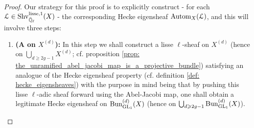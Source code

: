             \begin{proof}
                Our strategy for this proof is to explicitly construct - for each $\mathcal{L} \in \mathrm{Shv}_{\bar{\mathbb{Q}}_{\ell}}^{\mathrm{lisse}, 1}(X)$ - the corresponding Hecke eigensheaf $\mathrm{Autom}_X(\mathcal{L})$, and this will involve three steps:
                    \begin{enumerate}
                        \item \textbf{(A  on $X^{(d)}$):} In this step we shall construct a lisse $\ell$-sheaf on $X^{(d)}$ (hence on $\bigcup_{d \geq 2g - 1} X^{(d)}$; cf. proposition \ref{prop: the_unramified_abel_jacobi_map_is_a_projective_bundle}) satisfying an analogue of the Hecke eigensheaf property (cf. definition \ref{def: hecke_eigensheaves}) with the purpose in mind being that by pushing this lisse $\ell$-adic sheaf forward using the Abel-Jacobi map, one shall obtain a legitimate Hecke eigensheaf on $\mathrm{Bun}_{\operatorname{GL}_1}^{(d)}(X)$ (hence on $\bigcup_{d \geqslant 2g - 1} \mathrm{Bun}_{\operatorname{GL}_1}^{(d)}(X)$).
                        

\end{enumerate}
\end{proof}
